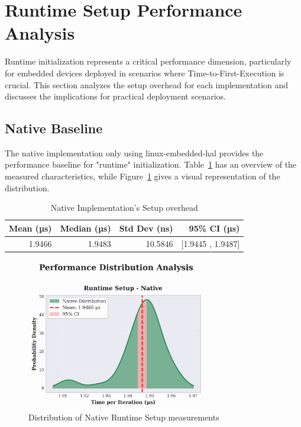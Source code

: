 \section{Runtime Setup Performance Analysis}
\label{sec:eval-setup}

Runtime initialization represents a critical performance dimension, particularly for embedded devices deployed in scenarios where Time-to-First-Execution is crucial. This section analyzes the setup overhead for each implementation and discusses the implications for practical deployment scenarios.

\subsection{Native Baseline}
\label{subsec:eval-setup-native}

The native implementation only using linux-embedded-hal provides the performance baseline for "runtime" initialization. Table~\ref{tab:native-setup} has an overview of the measured characteristics, while Figure~\ref{fig:native-setup-distribution} gives a visual representation of the distribution.

\begin{table}[htbp]
    \centering
    \caption{Native Implementation's Setup overhead}
    \label{tab:native-setup}
    \begin{tabular}{rrrr}
        \toprule
        \textbf{Mean (µs)} & \textbf{Median (µs)} & \textbf{Std Dev (ns)} & \textbf{95\% CI (µs)} \\
        \midrule
        1.9466 & 1.9483 & 10.5846 & [1.9445 , 1.9487] \\
        \bottomrule
    \end{tabular}
\end{table}

\begin{figure}[h]
    \centering
    \includegraphics[width=0.7\textwidth]{images/native-setup-distribution}
    \caption{Distribution of Native Runtime Setup measurements}
    \label{fig:native-setup-distribution}
\end{figure}

